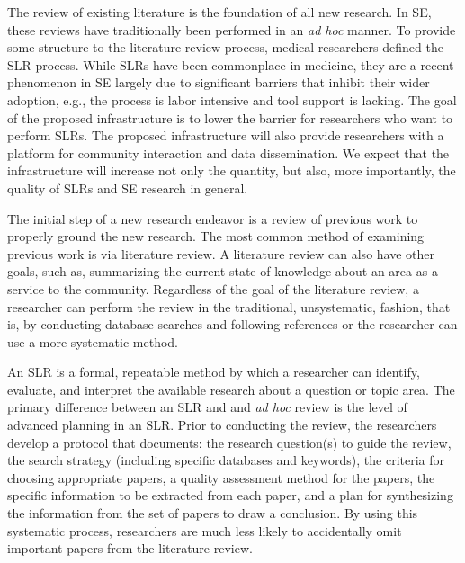 
The review of existing literature is the foundation of all new research. In SE, these reviews have traditionally been performed in an \emph{ad hoc} manner. To provide some structure to the literature review process, medical researchers defined the SLR process. While SLRs have been commonplace in medicine, they are a recent phenomenon in SE largely due to significant barriers that inhibit their wider adoption, e.g., the process is labor intensive and tool support is lacking. The goal of the proposed infrastructure is to lower the barrier for researchers who want to perform SLRs. The proposed infrastructure will also provide researchers with a platform for community interaction and data dissemination. We expect that the infrastructure will increase not only the quantity, but also, more importantly, the quality of SLRs and SE research in general. %

The initial step of a new research endeavor is a review of previous work to properly ground the new research. The most common method of examining previous work is via literature review. A literature review can also have other goals, such as, summarizing the current state of knowledge about an area as a service to the community. Regardless of the goal of the literature review, a researcher can perform the review in the traditional, unsystematic, fashion, that is, by conducting database searches and following references or the researcher can use a more systematic method. 

An SLR is a formal, repeatable method by which a researcher can identify, evaluate, and interpret the available research about a question or topic area. The primary difference between an SLR and and \emph{ad hoc} review is the level of advanced planning in an SLR. Prior to conducting the review, the researchers develop a protocol that documents: the research question(s) to guide the review, the search strategy (including specific databases and keywords), the criteria for choosing appropriate papers, a quality assessment method for the papers, the specific information to be extracted from each paper, and a plan for synthesizing the information from the set of papers to draw a conclusion. By using this systematic process, researchers are much less likely to accidentally omit important papers from the literature review.

